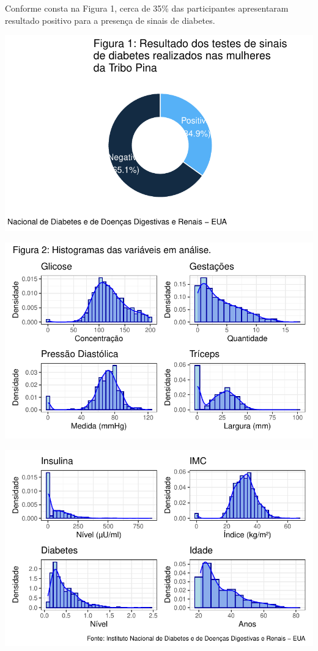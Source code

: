 \documentclass[
  twocolumn,
  landscape]{report}
\begin{document}
Conforme consta na Figura 1, cerca de 35\% das participantes
apresentaram resultado positivo para a presença de sinais de diabetes.

\includegraphics{relatorio_lab1_files/figure-pdf/unnamed-chunk-3-1.pdf}

\includegraphics{relatorio_lab1_files/figure-pdf/unnamed-chunk-4-1.pdf}

\includegraphics{relatorio_lab1_files/figure-pdf/unnamed-chunk-4-2.pdf}
\end{document}

